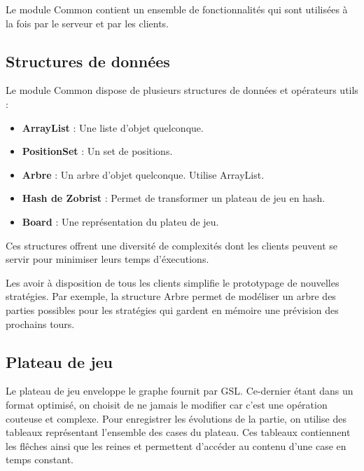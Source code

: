 Le module Common contient un ensemble de fonctionnalités qui sont 
utilisées à la fois par le serveur et par les clients. 

\subsection{Structures de données}
Le module Common dispose de plusieurs structures de données et opérateurs utils :
\begin{itemize}
    \item \textbf{ArrayList} : Une liste d'objet quelconque.
    \item \textbf{PositionSet} : Un set de positions.
    \item \textbf{Arbre} : Un arbre d'objet quelconque. Utilise ArrayList.
    \item \textbf{Hash de Zobrist} : Permet de transformer un plateau de jeu en hash.
    \item \textbf{Board} : Une représentation du plateu de jeu.
\end{itemize}

Ces structures offrent une diversité de complexités dont les clients 
peuvent se servir pour minimiser leurs temps d'éxecutions.

Les avoir à disposition de tous les clients simplifie le prototypage de nouvelles stratégies.
Par exemple, la structure Arbre permet de modéliser un arbre des parties possibles pour les 
stratégies qui gardent en mémoire une prévision des prochains tours.

\subsection{Plateau de jeu}
Le plateau de jeu enveloppe le graphe fournit par GSL.
Ce-dernier étant dans un format optimisé, on choisit de ne jamais 
le modifier car c'est une opération couteuse et complexe. Pour 
enregistrer les évolutions de la partie, on utilise des 
tableaux représentant l'ensemble des cases du plateau.
Ces tableaux contiennent les flêches ainsi que les reines 
et permettent d'accéder au contenu d'une case en temps constant.